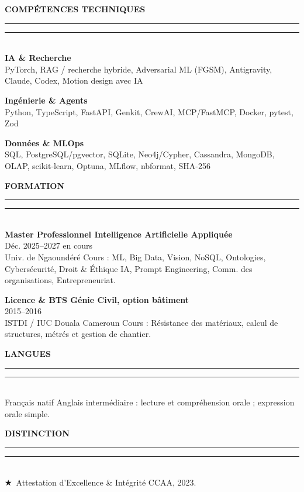 \documentclass[10pt,a4paper]{article}
\newcommand{\sideSecTitle}[1]{%
  \vspace{11pt}%
  {\fontsize{10.3}{12.4}\selectfont\textbf{\color{sectionNavy}\MakeUppercase{#1}}}\\[2.5pt]%
  {\color{accentTeal}\rule{14mm}{1.1pt}\color{subtleRule}\rule{\dimexpr\linewidth-14mm\relax}{0.55pt}}\\[5.5pt]%
}
\begin{document}
\noindent\begin{minipage}[t]{0.310\textwidth}
  \raggedright
  \vspace{0pt}
  \sideSecTitle{Compétences techniques}
  \textbf{\color{sectionNavy}\fontsize{10.0}{12.2}\selectfont IA \& Recherche}\\[2.2pt]
  {\fontsize{9.6}{13.0}\selectfont\color{bodyText}PyTorch, RAG / recherche hybride, Adversarial ML (FGSM), Antigravity, Claude, Codex, Motion design avec IA}
\vspace{10pt}

  \textbf{\color{sectionNavy}\fontsize{10.0}{12.2}\selectfont Ingénierie \& Agents}\\[2.2pt]
  {\fontsize{9.6}{13.0}\selectfont\color{bodyText}Python, TypeScript, FastAPI, Genkit, CrewAI, MCP/FastMCP, Docker, pytest, Zod}
\vspace{10pt}

  \textbf{\color{sectionNavy}\fontsize{10.0}{12.2}\selectfont Données \& MLOps}\\[2.2pt]
  {\fontsize{9.6}{13.0}\selectfont\color{bodyText}SQL, PostgreSQL/pgvector, SQLite, Neo4j/Cypher, Cassandra, MongoDB, OLAP, scikit-learn, Optuna, MLflow, nbformat, SHA-256}

  \vspace{6pt}
  \sideSecTitle{Formation}
  \textbf{\color{primaryDark}\fontsize{9.9}{12.5}\selectfont Master Professionnel \textperiodcentered{} Intelligence Artificielle Appliquée}\\[1.8pt]
  {\fontsize{8.9}{11.2}\selectfont\color{mutedSlate}Déc. 2025--2027 \textperiodcentered{} en cours}\\[2.5pt]
  {\fontsize{9.5}{12.9}\selectfont\color{bodyText}Univ. de Ngaoundéré \textperiodcentered{} Cours : ML, Big Data, Vision, NoSQL, Ontologies, Cybersécurité, Droit \& Éthique IA, Prompt Engineering, Comm. des organisations, Entrepreneuriat.}
\vspace{11pt}

  \textbf{\color{primaryDark}\fontsize{9.9}{12.5}\selectfont Licence \& BTS \textperiodcentered{} Génie Civil, option bâtiment}\\[1.8pt]
  {\fontsize{8.9}{11.2}\selectfont\color{mutedSlate}2015--2016}\\[2.5pt]
  {\fontsize{9.5}{12.9}\selectfont\color{bodyText}ISTDI / IUC Douala \textperiodcentered{} Cameroun \textperiodcentered{} Cours : Résistance des matériaux, calcul de structures, métrés et gestion de chantier.}

  \vspace{6pt}
  \sideSecTitle{Langues}
  {\fontsize{9.6}{13.1}\selectfont\color{bodyText}Français natif \textperiodcentered{} Anglais intermédiaire : lecture et compréhension orale ; expression orale simple.}

  \vspace{6pt}
  \sideSecTitle{Distinction}
  {\fontsize{9.6}{13.1}\selectfont\color{bodyText}\textcolor{goldAccent}{$\bigstar$}\ Attestation d’Excellence \& Intégrité \textperiodcentered{} CCAA, 2023.}
\end{minipage}%
\end{document}
